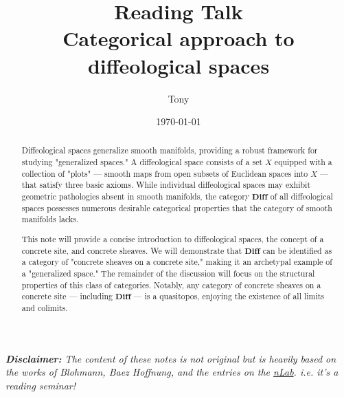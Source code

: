 \documentclass[a4paper,11pt]{article}  %
\title{Reading Talk \\ Categorical approach to diffeological spaces}
\author{Tony}
\date{\today}
\begin{document}

\maketitle
 
\begin{mdframed}[middlelinecolor=red,
middlelinewidth=2pt,
backgroundcolor=red!10,
roundcorner=10pt]
	\textit{\textbf{Disclaimer:} The content of these notes is not original but is heavily based on the works of Blohmann\cite{Blohmann24}, Baez Hoffnung\cite{Baez2011}, and the entries on the \href{https://ncatlab.org/}{\textit{nLab}}. i.e. it's a reading seminar!}
\end{mdframed}



\begin{abstract}
Diffeological spaces generalize smooth manifolds, providing a robust framework for studying "generalized spaces." A diffeological space consists of a set $X$ equipped with a collection of "plots" — smooth maps from open subsets of Euclidean spaces into $X$ — that satisfy three basic axioms. While individual diffeological spaces may exhibit geometric pathologies absent in smooth manifolds, the category $\mathbf{Diff}$ of all diffeological spaces possesses numerous desirable categorical properties that the category of smooth manifolds lacks.

This note will provide a concise introduction to diffeological spaces, the concept of a concrete site, and concrete sheaves. We will demonstrate that $\mathbf{Diff}$ can be identified as a category of "concrete sheaves on a concrete site," making it an archetypal example of a "generalized space." The remainder of the discussion will focus on the structural properties of this class of categories. Notably, any category of concrete sheaves on a concrete site — including $\mathbf{Diff}$ — is a quasitopos, enjoying the existence of all limits and colimits.
\end{abstract}
\end{document}

